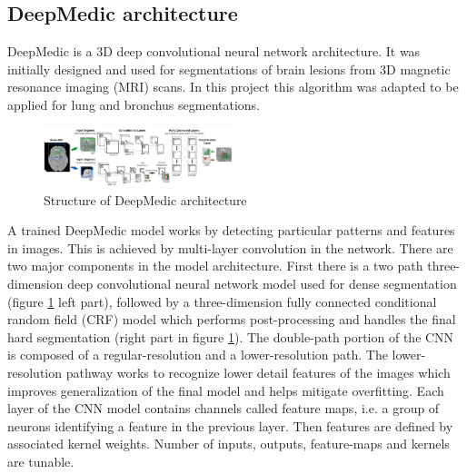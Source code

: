 \subsection{DeepMedic architecture}\label{deepmedic_chapter}
DeepMedic is a 3D deep convolutional neural network architecture. It was initially designed and used for segmentations of brain lesions from 3D magnetic resonance imaging (MRI) scans. In this project this algorithm was adapted to be applied for lung and bronchus segmentations. \newline
\begin{figure}[h!]
	\includegraphics[width=0.49\textwidth, angle=0]{files/deepMedic.png}
	\caption{Structure of DeepMedic architecture}
	\label{deepmedic}
\end{figure}
 
A trained DeepMedic model works by detecting particular patterns and features in images. This is achieved by multi-layer convolution in the network. There are two major components in the model architecture. First there is a two path three-dimension deep convolutional neural network model used for dense segmentation (figure \ref{deepmedic} left part), followed by a three-dimension fully connected conditional random field (CRF) model which performs post-processing and handles the final hard segmentation (right part in figure \ref{deepmedic}). The double-path portion of the CNN is composed of a regular-resolution and a lower-resolution path. The lower-resolution pathway works to recognize lower detail features of the images which improves generalization of the final model and helps mitigate overfitting.
Each layer of the CNN model contains channels called feature maps, i.e. a group of neurons identifying a feature in the previous layer. Then features are defined by associated kernel weights. Number of inputs, outputs, feature-maps and kernels are tunable.

